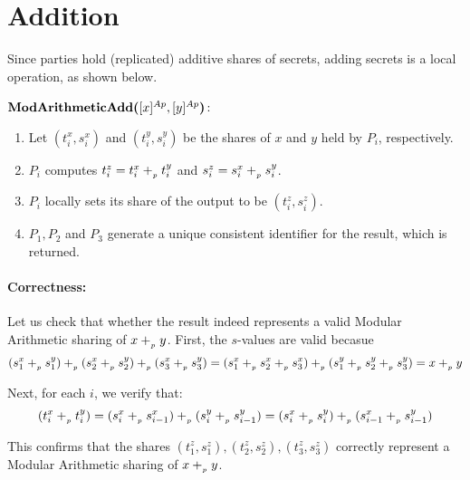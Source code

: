 \section{Addition}

Since parties hold (replicated) additive shares of secrets, adding secrets is a local operation, as shown below.

\begin{protocol}
	$\textbf{ModArithmeticAdd(}[x]^{Ap}, [y]^{Ap}\textbf{)}$:
	\begin{enumerate}
		\item Let $(t^x_i, s^x_i)$ and $(t^y_i, s^y_i)$ be the shares of $x$ and $y$ held by $P_i$, respectively.
		\item $P_i$ computes $t^z_i = t^x_i +_{_p} t^y_i$ and 
			$s^z_i = s^x_i +_{_p} s^y_i$.
		\item $P_i$ locally sets its share of the output to be $(t^z_i, s^z_i)$.
		\item $P_1, P_2$ and $P_3$ generate a unique consistent identifier
			for the result, which is returned.
	\end{enumerate}
\end{protocol}

\paragraph{Correctness:} 

Let us check that whether the result indeed represents a valid Modular Arithmetic sharing of $x +_{_p} y$. First, the $s$-values are valid becasue
\begin{equation}
    (s^x_1 +_{_p} s^y_1) +_{_p} (s^x_2 +_{_p} s^y_2) +_{_p} (s^x_3 +_{_p} s^y_3) = (s^x_1 +_{_p} s^x_2 +_{_p} s^x_3) +_{_p} (s^y_1 +_{_p} s^y_2 +_{_p} s^y_3) = x +_{_p} y
\end{equation}

Next, for each $i$, we verify that:
\begin{equation}
    (t^x_i +_{_p} t^y_i) = (s^x_i +_{_p} s^x_{i - 1}) +_{_p} (s^y_i +_{_p} s^y_{i - 1}) = (s^x_i +_{_p} s^y_i) +_{_p} (s^x_{i - 1} +_{_p} s^y_{i - 1})
\end{equation}

This confirms that the shares $(t^z_1, s^z_1), (t^z_2, s^z_2), (t^z_3, s^z_3)$ correctly represent a Modular Arithmetic sharing of $x +_{_p} y$.